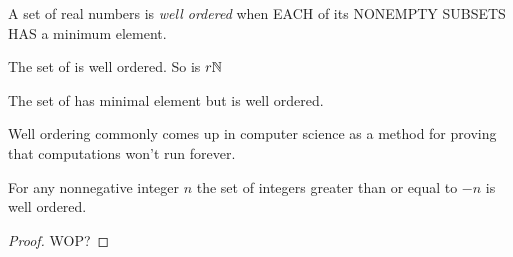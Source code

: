 \begin{definition}
    A set of real numbers is \textit{well ordered} when EACH of its NONEMPTY SUBSETS
    HAS a minimum element.
\end{definition}

\begin{ab}
    The set of  is well ordered. So is $r\mathbb{N}$

    The set of  has minimal element but is 
    well ordered.
\end{ab}

\begin{ab}
    Well ordering commonly comes up in computer science as a method for proving
    that computations won't run forever.
\end{ab}

\begin{claim}
    For any nonnegative integer $n$ the set of integers greater than or
    equal to $-n$ is well ordered.
\end{claim}

\begin{proof}
    WOP?
\end{proof}
